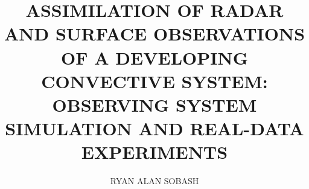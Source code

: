 \documentclass[letter,12pt,dissertation]{OUdissertation}
\begin{document}
\title{ASSIMILATION OF RADAR AND SURFACE OBSERVATIONS OF A DEVELOPING CONVECTIVE SYSTEM: OBSERVING SYSTEM SIMULATION AND REAL-DATA EXPERIMENTS}
\author{RYAN ALAN SOBASH}

\setlength{\parindent}{0.5in}
\graphicspath{{/Users/rsobash/Desktop/disserfigs/}}
\let\savedCaption=\caption
\renewcommand{\caption}[1]{\normalsize\OUsinglespace\savedCaption{#1}}

















%
%


\appendix


\end{document}
